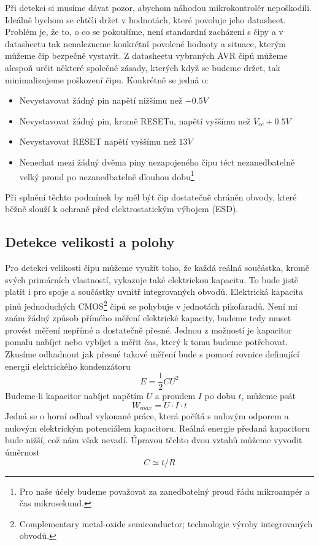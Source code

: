 \documentclass[11pt,a4paper,twoside,openright]{report}
\begin{document}
Při detekci si musíme dávat pozor, abychom náhodou mikrokontrolér nepoškodili. Ideálně bychom se chtěli držet v hodnotách, které povoluje jeho datasheet. Problém je, že to, o co se pokoušíme, není standardní zacházení s čipy a v datasheetu tak nenalezneme konkrétní povolené hodnoty a situace, kterým můžeme čip bezpečně vystavit. Z datasheetu vybraných AVR čipů \cite{attiny85, atmega328, atmega2560, attiny84} můžeme alespoň určit některé společné zásady, kterých když se budeme držet, tak minimalizujeme poškození čipu. Konkrétně se jedná o:
\begin{itemize}
	\item Nevystavovat žádný pin napětí nižšímu než $-0.5V$
	\item Nevystavovat žádný pin, kromě RESETu, napětí vyššímu než ${V}_{cc} + 0.5V$
	\item Nevystavovat RESET napětí vyššímu než $13V$
	\item Nenechat mezi žádný dvěma piny nezapojeného čipu téct nezanedbatelně velký proud po nezanedbatelně dlouhou dobu\footnote{Pro naše účely budeme považovat za zanedbatelný proud řádu mikroampér a čas mikrosekund.}
\end{itemize}
Při splnění těchto podmínek by měl být čip dostatečně chráněn obvody, které běžně slouží k ochraně před elektrostatickým výbojem (ESD). 

\subsection {Detekce velikosti a polohy \label{theory:capacitance}}

Pro detekci velikosti čipu můžeme využít toho, že každá reálná součástka, kromě svých primárních vlastností, vykazuje také elektrickou kapacitu. To bude jistě platit i pro spoje a součástky uvnitř integrovaných obvodů. Elektrická kapacita pinů jednoduchých CMOS\footnote{Complementary metal-oxide semiconductor; technologie výroby integrovaných obvodů.} čipů \cite{multiplexer, switch2, switch1} se pohybuje v jednotách pikofaradů. Není mi znám žádný způsob přímého měření elektrické kapacity, budeme tedy muset provést měření nepřímé a dostatečně přesné. Jednou z možností je kapacitor pomalu nabíjet nebo vybíjet a měřit čas, který k tomu budeme potřebovat. Zkusíme odhadnout jak přesné takové měření bude s pomocí rovnice definující energii elektrického kondenzátoru \begin{equation} E = \frac{1}{2}CU^2 \end{equation}
Budeme-li kapacitor nabíjet napětím $U$ a proudem $I$ po dobu $t$, můžeme psát
\begin{equation} {W}_{max} = U \cdot I \cdot t \end{equation} 
Jedná se o horní odhad vykonané práce, která počítá s nulovým odporem a nulovým elektrickým potenciálem kapacitoru. Reálná energie předaná kapacitoru bude nižší, což nám však nevadí. Úpravou těchto dvou vztahů můžeme vyvodit úměrnost
\begin{equation} C \simeq t / R \end{equation}
\end{document}
